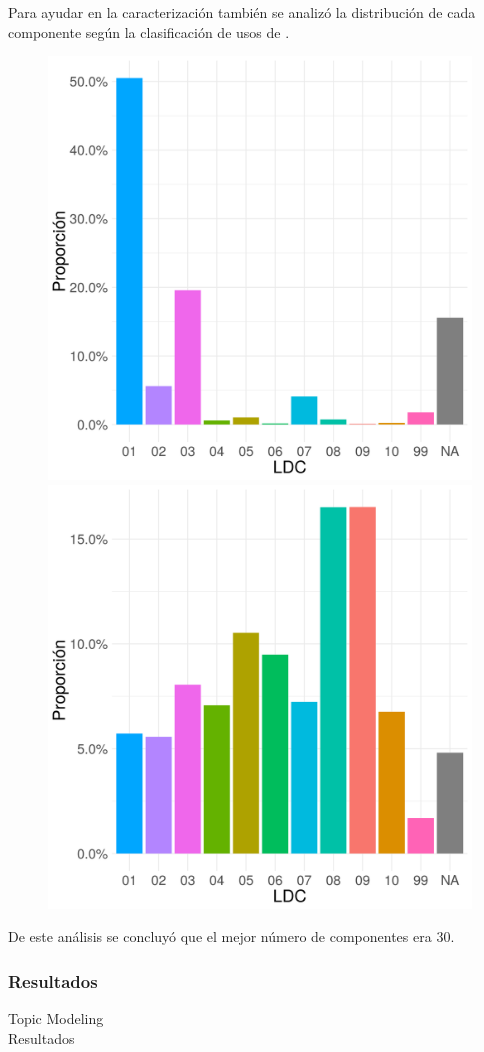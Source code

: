\documentclass[compress]{beamer}
\begin{document}
\begin{frame}

Para ayudar en la caracterización también se analizó la distribución de cada componente según la clasificación de usos de \cite{lall2000technological}.
\begin{figure}
\centering
\includegraphics[width=0.45\linewidth]{graficoLall_k2_comp1}
\includegraphics[width=0.45\linewidth]{graficoLall_k2_comp2}	
\end{figure}

De este análisis se concluyó que el mejor número de componentes era 30.

\end{frame}

\subsubsection{Resultados}

\begin{frame}
\centering
\Large Topic Modeling \\

\normalsize Resultados
\end{frame}
\end{document}
